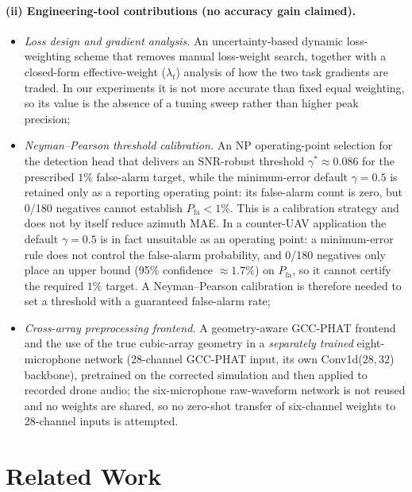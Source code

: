 \documentclass[sensors,article,submit,pdftex,moreauthors]{Definitions/mdpi}
\begin{document}
\paragraph{(ii) Engineering-tool contributions (no accuracy gain claimed).}
\begin{itemize}
    \item \emph{Loss design and gradient analysis.} An uncertainty-based dynamic loss-weighting scheme that removes manual loss-weight search, together with a closed-form effective-weight ($\lambda_t$) analysis of how the two task gradients are traded. In our experiments it is not more accurate than fixed equal weighting, so its value is the absence of a tuning sweep rather than higher peak precision;
    \item \emph{Neyman--Pearson threshold calibration.} An NP operating-point selection for the detection head that delivers an SNR-robust threshold $\gamma^*\approx0.086$ for the prescribed $1\%$ false-alarm target, while the minimum-error default $\gamma=0.5$ is retained only as a reporting operating point: its false-alarm count is zero, but 0/180 negatives cannot establish $P_{\mathrm{fa}}<1\%$. This is a calibration strategy and does not by itself reduce azimuth MAE. In a counter-UAV application the default $\gamma=0.5$ is in fact unsuitable as an operating point: a minimum-error rule does not control the false-alarm probability, and 0/180 negatives only place an upper bound (95\% confidence $\approx1.7\%$) on $P_{\mathrm{fa}}$, so it cannot certify the required $1\%$ target. A Neyman--Pearson calibration is therefore needed to set a threshold with a guaranteed false-alarm rate;
    \item \emph{Cross-array preprocessing frontend.} A geometry-aware GCC-PHAT frontend and the use of the true cubic-array geometry in a \emph{separately trained} eight-microphone network (28-channel GCC-PHAT input, its own Conv1d($28,32$) backbone), pretrained on the corrected simulation and then applied to recorded drone audio; the six-microphone raw-waveform network is not reused and no weights are shared, so no zero-shot transfer of six-channel weights to 28-channel inputs is attempted.
\end{itemize}

\section{Related Work}
\label{sec:related}
\end{document}
